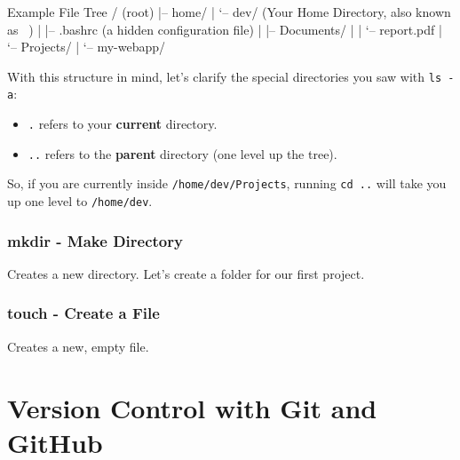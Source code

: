 \documentclass[11pt, a4paper]{article}
\newcommand{\cmd}[1]{\texttt{\textcolor{commandColor}{#1}}}
\begin{document}
\begin{terminal}{Example File Tree}
/ (root)
|-- home/
|   `-- dev/  (Your Home Directory, also known as ~)
|       |-- .bashrc (a hidden configuration file)
|       |-- Documents/
|       |   `-- report.pdf
|       `-- Projects/
|           `-- my-webapp/
\end{terminal}

With this structure in mind, let's clarify the special directories you saw with \cmd{ls -a}:
\begin{itemize}
    \item \cmd{.} refers to your \textbf{current} directory.
    \item \cmd{..} refers to the \textbf{parent} directory (one level up the tree).
\end{itemize}

So, if you are currently inside \cmd{/home/dev/Projects}, running \cmd{cd ..} will take you up one level to \cmd{/home/dev}.


\subsubsection{mkdir - Make Directory}
Creates a new directory. Let's create a folder for our first project.

\subsubsection{touch - Create a File}
Creates a new, empty file.


\section{Version Control with Git and GitHub}
\end{document}
